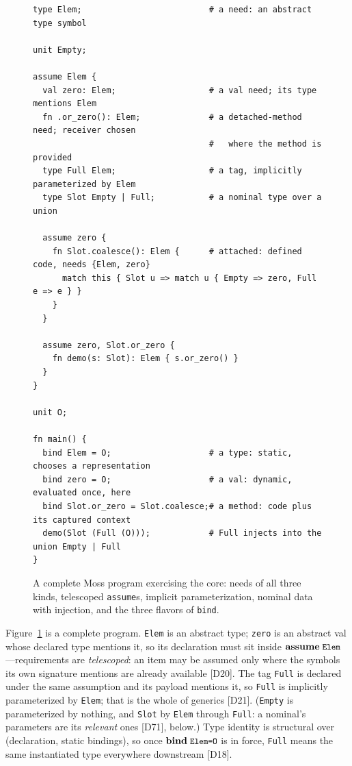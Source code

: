 \documentclass[10pt]{article}
\newcommand{\kw}[1]{\mathbf{#1}}          %
\newcommand{\smallcode}[1]{\texttt{\small #1}}
\theoremstyle{plain}
\theoremstyle{remark}
\begin{document}
\begin{figure}[t]
\begin{verbatim}
type Elem;                          # a need: an abstract type symbol

unit Empty;

assume Elem {
  val zero: Elem;                   # a val need; its type mentions Elem
  fn .or_zero(): Elem;              # a detached-method need; receiver chosen
                                    #   where the method is provided
  type Full Elem;                   # a tag, implicitly parameterized by Elem
  type Slot Empty | Full;           # a nominal type over a union

  assume zero {
    fn Slot.coalesce(): Elem {      # attached: defined code, needs {Elem, zero}
      match this { Slot u => match u { Empty => zero, Full e => e } }
    }
  }

  assume zero, Slot.or_zero {
    fn demo(s: Slot): Elem { s.or_zero() }
  }
}

unit O;

fn main() {
  bind Elem = O;                    # a type: static, chooses a representation
  bind zero = O;                    # a val: dynamic, evaluated once, here
  bind Slot.or_zero = Slot.coalesce;# a method: code plus its captured context
  demo(Slot (Full (O)));            # Full injects into the union Empty | Full
}
\end{verbatim}
\caption{A complete Moss program exercising the core: needs of all three
kinds, telescoped \texttt{assume}s, implicit parameterization, nominal
data with injection, and the three flavors of \texttt{bind}.}
\label{fig:example}
\end{figure}

Figure~\ref{fig:example} is a complete program. \smallcode{Elem} is an
abstract type; \smallcode{zero} is an abstract val whose declared type
mentions it, so its declaration must sit inside
$\kw{assume}\;\smallcode{Elem}$---requirements are \emph{telescoped}:
an item may be assumed only where the symbols its own signature mentions
are already available [D20]. The tag \smallcode{Full} is declared under
the same assumption and its payload mentions it, so \smallcode{Full} is
implicitly parameterized by \smallcode{Elem}; that is the whole of
generics [D21]. (\smallcode{Empty} is parameterized by nothing, and
\smallcode{Slot} by \smallcode{Elem} through \smallcode{Full}: a
nominal's parameters are its \emph{relevant} ones [D71], below.) Type identity is
structural over (declaration, static bindings), so once
$\kw{bind}\;\smallcode{Elem=O}$ is in force, \smallcode{Full} means the
same instantiated type everywhere downstream [D18].
\end{document}
